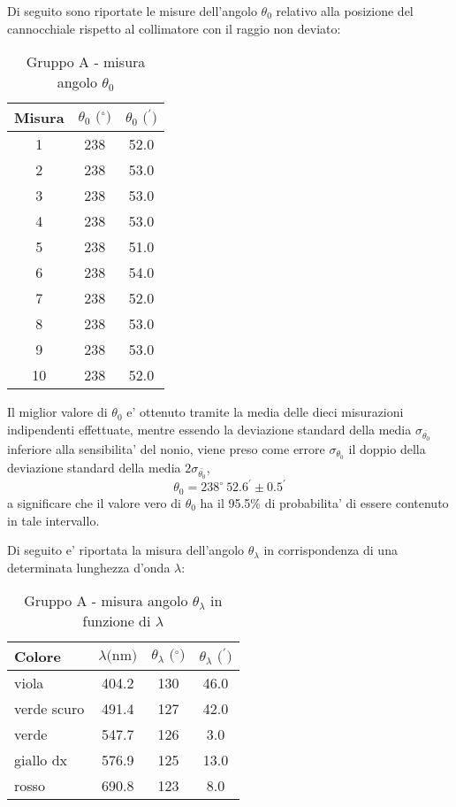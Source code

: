 Di seguito sono riportate le misure dell'angolo $\theta_0$ relativo alla posizione del cannocchiale rispetto al collimatore con il raggio non deviato:
\begin{table}[!htbp]
    {\par\centering
    \begin{tabular}{ccc}
        \hline
        Misura & $\theta_0 \text{ ($^{\circ}$)}$ & $\theta_0 \text{ ($^{\prime}$)}$ \\
        \hline
        1   &   238 &   52.0\\
        2   &   238 &   53.0\\
        3   &   238 &   53.0\\
        4   &   238 &   53.0\\
        5   &   238 &   51.0\\
        6   &   238 &   54.0\\
        7   &   238 &   52.0\\
        8   &   238 &   53.0\\
        9   &   238 &   53.0\\
        10  &   238 &   52.0\\
        \hline
    \end{tabular}
    \par}
    \caption{Gruppo A - misura angolo $\theta_0$}
\end{table}

Il miglior valore di $\theta_0$ e' ottenuto tramite la media delle dieci misurazioni indipendenti effettuate, mentre essendo la deviazione standard della media $\sigma_{\bar{\theta_0}}$ inferiore alla sensibilita' del nonio, viene preso come errore $\sigma_{\theta_0}$ il doppio della deviazione standard della media $2\sigma_{\bar{\theta_0}}$,
\[
    \theta_0 = 238^{\circ} \ 52.6^{\prime} \pm 0.5^{\prime}
\]
a significare che il valore vero di $\theta_0$ ha il 95.5\% di probabilita' di essere contenuto in tale intervallo.

Di seguito e' riportata la misura dell'angolo $\theta_{\lambda}$ in corrispondenza di una determinata lunghezza d'onda $\lambda$:
\begin{table}[!htbp]
    {\par\centering
    \begin{tabular}{lccc}
        \hline
            Colore &
            $\lambda \text{(nm)}$ &
            $\theta_{\lambda} \text{ ($^{\circ}$)}$ & 
            $\theta_{\lambda} \text{ ($^{\prime}$)}$ \\
        \hline
        viola       &   404.2   &   130 &   46.0\\
        verde scuro &   491.4   &   127 &   42.0\\
        verde       &   547.7   &   126 &   3.0\\
        giallo dx   &   576.9   &   125 &   13.0\\
        rosso       &   690.8   &   123 &   8.0\\
        \hline
    \end{tabular}
    \par}
    \caption{Gruppo A - misura angolo $\theta_{\lambda}$ in funzione di $\lambda$}
\end{table}

